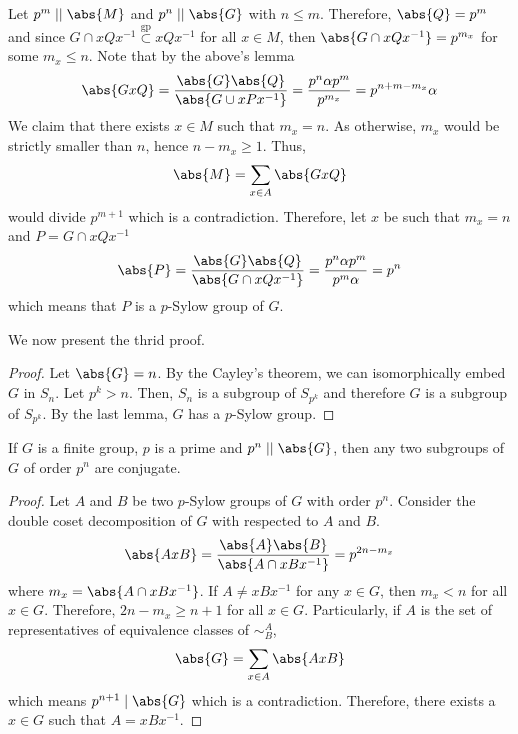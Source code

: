 \begin{prooflemma}
    Let \(p^m \mid\mid \abs{M}\) and \(p^n \mid \mid \abs{G}\) with \(n \leq m\). Therefore, \(\abs{Q} = p^m\) and since \(G \cap xQx^{-1} \overset{\mathrm{gp}}{\subset} xQx^{-1}\) for all \(x \in M\), then \(\abs{G \cap xQx^{-1}} = p^{m_x}\) for some \(m_x \leq n\). Note that by the above's lemma
    \begin{equation*}
        \abs{GxQ} =  \dfrac{\abs{G} \abs{Q}}{\abs{G \cup xPx^{-1}}} = \dfrac{p^n \alpha p^m}{p^{m_x}} = p^{n + m - m_x} \alpha
    \end{equation*}
    We claim that there exists \(x \in M\) such that \(m_x = n\). As otherwise, \(m_x\) would be strictly smaller than \(n\), hence \(n - m_x \geq 1\). Thus, 
    \begin{equation*}
        \abs{M} = \sum_{x \in A} \abs{GxQ}
    \end{equation*}
    would divide \(p^{m+1}\) which is a contradiction. Therefore, let \(x\) be such that \(m_x  = n\) and \(P = G \cap xQx^{-1}\)
    \begin{equation*}
        \abs{P} = \dfrac{\abs{G} \abs{Q}}{\abs{G \cap xQx^{-1}}} = \dfrac{p^n \alpha p^m}{p^m \alpha} = p^n
    \end{equation*}
    which means that \(P\) is a \(p\)-Sylow group of \(G\).
\end{prooflemma}

We now present the thrid proof.
\begin{proof}
    Let \(\abs{G} = n\). By the Cayley's theorem, we can isomorphically embed \(G\) in \(S_n\). Let \(p^k > n\). Then, \(S_n\) is a subgroup of \(S_{p^k}\) and therefore \(G\) is a subgroup of \(S_{p^k}\). By the last lemma, \(G\) has a \(p\)-Sylow group.
\end{proof}

\begin{theorem}
    If \(G\) is a finite group, \(p\) is a prime and \(p^n \mid\mid \abs{G}\), then any two subgroups of \(G\) of order \(p^n\) are conjugate.
\end{theorem}

\begin{proof}
    Let \(A\) and \(B\) be two \(p\)-Sylow groups of \(G\) with order \(p^n\). Consider the double coset decomposition of \(G\) with respected to \(A\) and \(B\).
    \begin{equation*}
        \abs{AxB} = \dfrac{\abs{A} \abs{B}}{\abs{A \cap xBx^{-1}}} = p^{2n - m_x}
    \end{equation*}
    where \(m_x = \abs{A \cap xBx^{-1}}\). If \(A \neq xBx^{-1}\) for any \(x \in G\), then \(m_x < n\) for all \(x \in G\). Therefore, \(2n -m_x \geq n + 1\) for all \(x \in G\). Particularly, if \(A\) is the set of representatives of equivalence classes of \(\sim^A_B\), 
    \begin{equation*}
        \abs{G} = \sum_{x \in A} \abs{AxB}
    \end{equation*}
    which means \(p^{n+1} \mid \abs{G}\) which is a contradiction. Therefore, there exists a \(x \in G\) such that \(A = xBx^{-1}\).
\end{proof}

